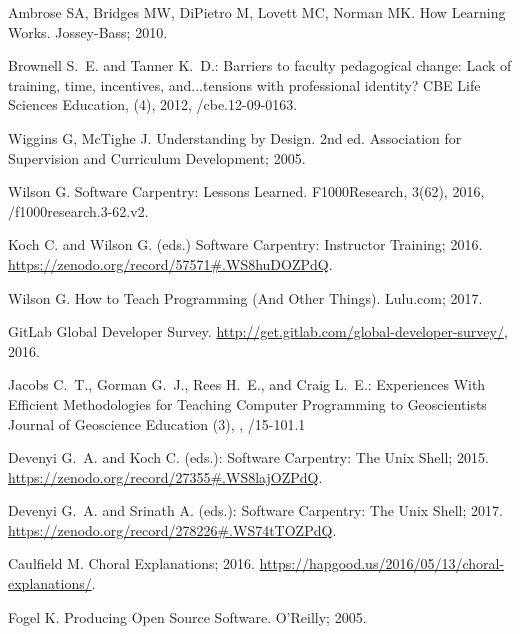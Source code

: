 \documentclass[10pt,letterpaper]{article}
\begin{document}
%
%

\newpage

\begin{thebibliography}{1}

Ambrose SA, Bridges MW, DiPietro M, Lovett MC, Norman MK.
\newblock How Learning Works.
\newblock Jossey-Bass; 2010.

Brownell S.~E. and Tanner K.~D.:
Barriers to faculty pedagogical change: Lack of training, time, incentives, and...tensions with professional identity?
\newblock CBE Life Sciences Education,
(4), 2012,
/cbe.12-09-0163.

Wiggins G, McTighe J.
\newblock Understanding by Design.
\newblock 2nd ed. Association for Supervision and Curriculum Development; 2005.

Wilson G.
\newblock Software Carpentry: Lessons Learned.
\newblock F1000Research, 3(62), 2016,
/f1000research.3-62.v2.

Koch C. and Wilson G. (eds.)
\newblock Software Carpentry: Instructor Training; 2016.
\newblock \url{https://zenodo.org/record/57571#.WS8huDOZPdQ}.

Wilson G.
\newblock How to Teach Programming (And Other Things).
\newblock Lulu.com; 2017.

GitLab
\newblock Global Developer Survey.
\newblock \url{http://get.gitlab.com/global-developer-survey/}, 2016.

Jacobs C.~T., Gorman G.~J., Rees H.~E., and Craig L.~E.:
Experiences With Efficient Methodologies for Teaching Computer Programming to Geoscientists
\newblock Journal of Geoscience Education
(3),
,
/15-101.1

Devenyi G.~A. and Koch C. (eds.):
Software Carpentry: The Unix Shell; 2015.
\newblock \url{https://zenodo.org/record/27355#.WS8lajOZPdQ}.

Devenyi G.~A. and Srinath A. (eds.):
Software Carpentry: The Unix Shell; 2017.
\newblock \url{https://zenodo.org/record/278226#.WS74tTOZPdQ}.

Caulfield M. Choral Explanations; 2016.
\newblock \url{https://hapgood.us/2016/05/13/choral-explanations/}.

Fogel K.
\newblock Producing Open Source Software.
\newblock O'Reilly; 2005.

\end{thebibliography}
\end{document}
